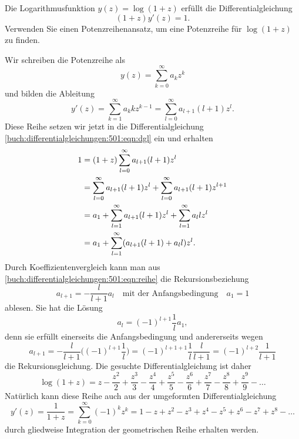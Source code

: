 Die Logarithmusfunktion $y(z) = \log (1+z)$ erfüllt die Differentialgleichung
\begin{equation}
(1+z)y'(z) = 1.
\label{buch:differentialgleichungen:501:eqn:dgl}
\end{equation}
Verwenden Sie einen Potenzreihenansatz, um eine Potenzreihe für $\log(1+z)$
zu finden.

\begin{loesung}
Wir schreiben die Potenzreihe als
\[
y(z)
=
\sum_{k=0}^\infty
a_k z^k
\]
und bilden die Ableitung
\[
y'(z)
=
\sum_{k=1}^\infty
a_k k z^{k-1}
=
\sum_{l=0}^\infty
a_{l+1}(l+1)z^l.
\]
Diese Reihe setzen wir jetzt in die Differentialgleichung
\eqref{buch:differentialgleichungen:501:eqn:dgl}
ein und erhalten
\begin{align}
1
&=
(1+z)
\sum_{l=0}^\infty
a_{l+1}(l+1)z^l
\notag
\\
&=
\sum_{l=0}^\infty
a_{l+1}(l+1)z^l
+
\sum_{l=0}^\infty
a_{l+1}(l+1)z^{l+1}
\notag
\\
&=
a_1
+
\sum_{l=1}^\infty
a_{l+1}(l+1)z^l
+
\sum_{l=1}^\infty
a_{l}lz^l
\notag
\\
&=
a_1
+
\sum_{l=1}^\infty
(a_{l+1}(l+1)+a_{l}l)z^l.
\label{buch:differentialgleichungen:501:eqn:reihe}
\end{align}
Durch Koeffizientenvergleich kann man aus
\eqref{buch:differentialgleichungen:501:eqn:reihe}
die Rekursionsbeziehung
\[
a_{l+1} = -\frac{l}{l+1} a_l
\quad\text{mit der Anfangsbedingung}\quad a_1=1
\]
ablesen.
Sie hat die Lösung
\[
a_l
=
(-1)^{l+1}\frac{1}{l} a_1,
\]
denn sie erfüllt einerseits die Anfangsbedingung und andererseits
wegen
\[
a_{l+1}
=
-\frac{l}{l+1}
\biggl(
(-1)^{l+1}\frac{1}{l}
\biggr)
=
(-1)^{l+1+1}
\frac{1}{l}
\frac{l}{l+1}
=
(-1)^{l+2}
\frac{1}{l+1}
\]
die Rekursionsgleichung.
Die gesuchte Differentialgleichung ist daher
\[
\log(1+z)
=
z
-\frac{z^2}{2}
+\frac{z^3}{3}
-\frac{z^4}{4}
+\frac{z^5}{5}
-\frac{z^6}{6}
+\frac{z^7}{7}
-\frac{z^8}{8}
+\frac{z^9}{9}
-\dots
\]
Natürlich kann diese Reihe auch aus der umgeformten Differentialgleichung
\[
y'(z)
=
\frac{1}{1+z}
=
\sum_{k=0}^\infty (-1)^kz^k
=
1-z+z^2-z^3+z^4-z^5+z^6-z^7+z^8-\dots
\]
durch gliedweise Integration der geometrischen Reihe erhalten werden.
\end{loesung}


